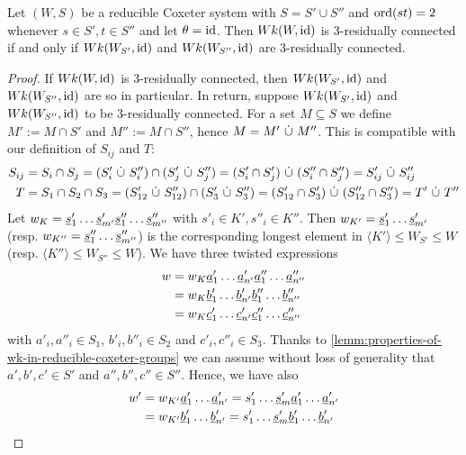 \begin{theo}
	Let $(W,S)$ be a reducible Coxeter system with $S = S' \cup S''$ and $\operatorname{ord}(st) = 2$ whenever $s \in S', t \in S''$ and let $\theta = \operatorname{id}$. Then $Wk(W,\operatorname{id})$ is 3-residually connected if and only if $Wk(W_{S'},\operatorname{id})$ and $Wk(W_{S''},\operatorname{id})$ are 3-residually connected.

	\begin{proof}
		If $Wk(W,\operatorname{id})$ is 3-residually connected, then $Wk(W_{S'},\operatorname{id})$ and $Wk(W_{S''},\operatorname{id})$ are so in particular. In return, suppose $Wk(W_{S'},\operatorname{id})$ and $Wk(W_{S''},\operatorname{id})$ to be 3-residually connected. For a set $M \subseteq S$ we define $M' := M \cap S'$ and $M'' := M \cap S''$, hence $M = M' \ \dot \cup \  M''$. This is compatible with our definition of $S_{ij}$ and $T$:
		\begin{align*}
			S_{ij}	& = S_i \cap S_j = (S'_i \ \dot \cup \  S''_i) \cap (S'_j \ \dot \cup \  S''_j) = (S'_i \cap S'_j) \ \dot \cup \  (S''_i \cap S''_j) = S'_{ij} \ \dot \cup \  S''_{ij} \\
			T		& = S_1 \cap S_2 \cap S_3 = (S'_{12} \ \dot \cup \  S''_{12}) \cap (S'_3 \ \dot \cup \  S''_3) = (S'_{12} \cap S'_3) \ \dot \cup \  (S''_{12} \cap S''_3) = T' \ \dot \cup \  T''
		\end{align*}
		Let $w_K = \underline{s}'_1 \ldots \underline{s}'_{m'} \underline{s}''_1 \ldots \underline{s}''_{m''}$ with $s'_i \in K',s''_i \in K''$. Then
		$w_{K'} = \underline{s}'_1 \ldots \underline{s}'_{m'}$ (resp. $w_{K''} = \underline{s}''_1 \ldots \underline{s}''_{m''}$) is the corresponding longest element in $\langle K' \rangle \leq W_{S'} \leq W$ (resp. $\langle K'' \rangle \leq W_{S''} \leq W$).
		We have three twisted expressions
		\begin{align*}
			w	& = w_K \underline{a}'_1 \ldots \underline{a}'_{n'} \underline{a}''_1 \ldots \underline{a}''_{n''} \\
				& = w_K \underline{b}'_1 \ldots \underline{b}'_{n'} \underline{b}''_1 \ldots \underline{b}''_{n''} \\
				& = w_K \underline{c}'_1 \ldots \underline{c}'_{n'} \underline{c}''_1 \ldots \underline{c}''_{n''}
		\end{align*}
		with $a'_i,a''_i \in S_1$, $b'_i,b''_i \in S_2$ and $c'_i,c''_i \in S_3$. Thanks to \ref{lemm:properties-of-wk-in-reducible-coxeter-groups} we can assume without loss of generality that $a',b',c' \in S'$ and $a'',b'',c'' \in S''$. Hence, we have also
		\begin{align*}
			w'	& = w_{K'} \ul a'_1 \ldots \ul a'_{n'} = s'_1 \ldots \ul s'_m \ul a'_1 \ldots \ul a'_{n'} \\
				& = w_{K'} \ul b'_1 \ldots \ul b'_{n'} = s'_1 \ldots \ul s'_m \ul b'_1 \ldots \ul b'_{n'} \\

\end{align*}
\end{proof}
\end{theo}
